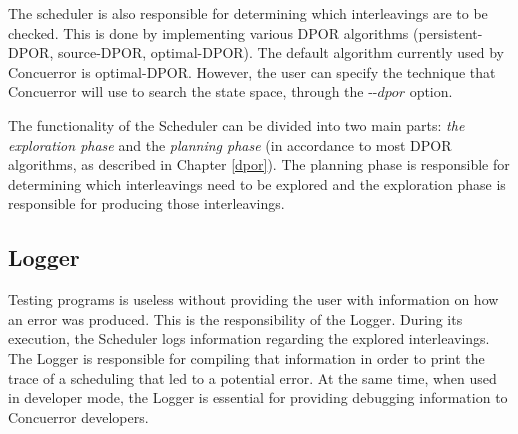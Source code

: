 The scheduler is also responsible for determining which interleavings are to be checked. This is done
by implementing various DPOR algorithms (persistent-DPOR, source-DPOR, optimal-DPOR). The default
algorithm currently used by Concuerror is optimal-DPOR. 
However, the user can specify the technique that Concuerror will use to search the state space, through the -{}-$dpor$ option.

The functionality of the Scheduler can be divided into two main parts: \textit{the exploration phase} and
the \textit{planning phase} (in accordance to most DPOR algorithms, as described in Chapter \ref{dpor}).
The planning phase is responsible for determining which interleavings need to be explored and the
exploration phase is responsible for producing those interleavings.

\subsection{Logger}

Testing programs is useless without providing the user with information on how an error was produced. This is
the responsibility of the Logger. During its execution, the Scheduler logs information regarding the explored interleavings. 
The Logger is responsible for compiling that information in order to print the trace of a scheduling that led to a
potential error. At the same time, when used in developer mode, the Logger is essential for providing debugging 
information to Concuerror developers.
